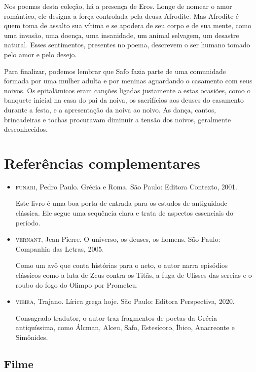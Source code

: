 \documentclass[12pt]{extarticle}
\begin{document}
Nos poemas desta coleção, há a presença de Eros. Longe de nomear o amor
romântico, ele designa a força controlada pela deusa Afrodite. Mas Afrodite 
é quem toma de assalto sua vítima e se apodera de seu corpo e de sua
mente, como uma invasão, uma doença, uma insanidade, um animal
selvagem, um desastre natural. Esses sentimentos, presentes no poema, 
descrevem o ser humano tomado pelo amor e pelo desejo.


Para finalizar, podemos lembrar que Safo fazia parte de uma comunidade 
formada por uma mulher adulta e por meninas aguardando o casamento com
seus noivos. Os epitalâmicos eram canções ligadas justamente a estas ocasiões,
como o banquete inicial na casa do pai da noiva, os sacrifícios aos deuses do casamento 
durante a festa, e a apresentação da noiva ao noivo. As dança, cantos, brincadeiras
e tochas procuravam diminuir a tensão dos noivos, geralmente desconhecidos.


\section{Referências complementares}

\begin{itemize}
\item \textsc{funari}, Pedro Paulo. Grécia e Roma. São Paulo: Editora Contexto,
2001.

Este livro é uma boa porta de entrada para os estudos de antiguidade
clássica. Ele segue uma sequência clara e trata de aspectos essenciais
do período.

\item \textsc{vernant}, Jean-Pierre. O universo, os deuses, os homens. São
Paulo: Companhia das Letras, 2005.

Como um avô que conta histórias para o neto, o autor narra episódios
clássicos como a luta de Zeus contra os Titãs, a fuga de Ulisses das
sereias e o roubo do fogo do Olimpo por Prometeu.

\item \textsc{vieira}, Trajano. Lírica grega hoje. São Paulo: Editora
Perspectiva, 2020.

Consagrado tradutor, o autor traz fragmentos de poetas da Grécia
antiquíssima, como Álcman, Alceu, Safo, Estesícoro, Íbico, Anacreonte e
Simônides.
\end{itemize}
\subsection{Filme}
\end{document}
